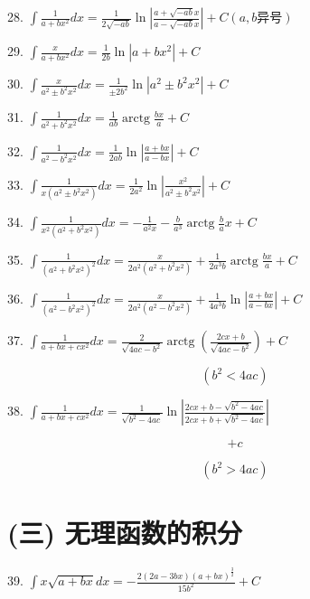 \documentclass[lang=cn,newtx,12pt,scheme=chinese]{elegantbook}
\begin{document}
28. \(\int \frac{1}{a + b{x}^{2}}{dx} = \frac{1}{2\sqrt{-{ab}}}\ln \left| \frac{a + \sqrt{-{ab}}x}{a - \sqrt{-{ab}}x}\right| + C\left( {a,b\text{异号}}\right)\)

29. \(\int \frac{x}{a + b{x}^{2}}{dx} = \frac{1}{2b}\ln \left| {a + b{x}^{2}}\right| + C\)

30. \(\int \frac{x}{{a}^{2} \pm {b}^{2}{x}^{2}}{dx} = \frac{1}{\pm 2{b}^{2}}\ln \left| {{a}^{2} \pm {b}^{2}{x}^{2}}\right| + C\)

31. \(\int \frac{1}{{a}^{2} + {b}^{2}{x}^{2}}{dx} = \frac{1}{ab}\operatorname{arctg}\frac{bx}{a} + C\)

32. \(\int \frac{1}{{a}^{2} - {b}^{2}{x}^{2}}{dx} = \frac{1}{2ab}\ln \left| \frac{a + {bx}}{a - {bx}}\right| + C\)

33. \(\int \frac{1}{x\left( {{a}^{2} \pm {b}^{2}{x}^{2}}\right) }{dx} = \frac{1}{2{a}^{2}}\ln \left| \frac{{x}^{2}}{{a}^{2} \pm {b}^{2}{x}^{2}}\right| + C\)

34. \(\int \frac{1}{{x}^{2}\left( {{a}^{2} + {b}^{2}{x}^{2}}\right) }{dx} = - \frac{1}{{a}^{2}x} - \frac{b}{{a}^{3}}\operatorname{arctg}\frac{b}{a}x + C\)

35. \(\int \frac{1}{{\left( {a}^{2} + {b}^{2}{x}^{2}\right) }^{2}}{dx} = \frac{x}{2{a}^{2}\left( {{a}^{2} + {b}^{2}{x}^{2}}\right) } + \frac{1}{2{a}^{3}b}\operatorname{arctg}\frac{bx}{a} + C\)

36. \(\int \frac{1}{{\left( {a}^{2} - {b}^{2}{x}^{2}\right) }^{2}}{dx} = \frac{x}{2{a}^{2}\left( {{a}^{2} - {b}^{2}{x}^{2}}\right) } + \frac{1}{4{a}^{3}b}\ln \left| \frac{a + {bx}}{a - {bx}}\right| + C\)

37. \(\int \frac{1}{a + {bx} + c{x}^{2}}{dx} = \frac{2}{\sqrt{{4ac} - {b}^{2}}}\operatorname{arctg}\left( \frac{{2cx} + b}{\sqrt{{4ac} - {b}^{2}}}\right) + C\)

\[
\left( {{b}^{2} < {4ac}}\right)
\]

38. \(\int \frac{1}{a + {bx} + c{x}^{2}}{dx} = \frac{1}{\sqrt{{b}^{2} - {4ac}}}\ln \left| \frac{{2cx} + b - \sqrt{{b}^{2} - {4ac}}}{{2cx} + b + \sqrt{{b}^{2} - {4ac}}}\right|\)

\[
+ c
\]

\[
\left( {{b}^{2} > {4ac}}\right)
\]

\section*{(三) 无理函数的积分}

39. \(\int x\sqrt{a + {bx}}{dx} = - \frac{2\left( {{2a} - {3bx}}\right) {\left( a + bx\right) }^{\frac{3}{2}}}{{15}{b}^{2}} + C\)
\end{document}

